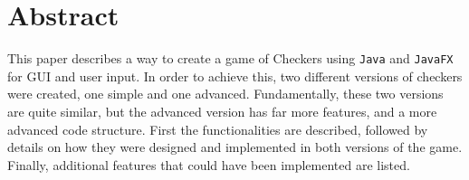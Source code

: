 \section*{Abstract}
This paper describes a way to create a game of Checkers using \texttt{Java} and \texttt{JavaFX} for GUI and user input. In order to achieve this, two different versions of checkers were created, one simple and one advanced. Fundamentally, these two versions are quite similar, but the advanced version has far more features, and a more advanced code structure. First the functionalities are described, followed by details on how they were designed and implemented in both versions of the game. Finally, additional features that could have been implemented are listed.